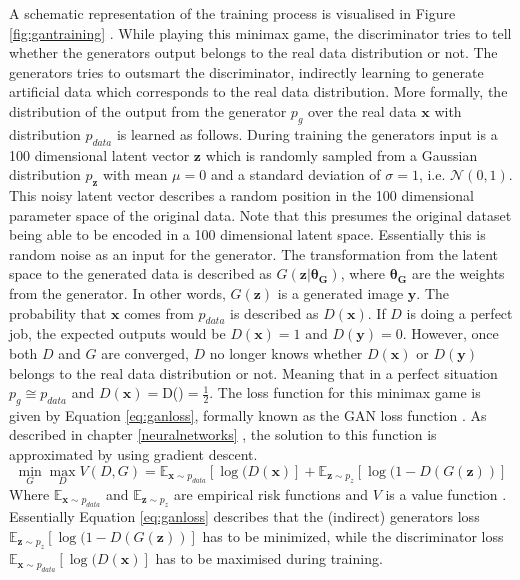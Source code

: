 A schematic representation of the training process is visualised in Figure \ref{fig:gantraining} . While playing this minimax game, the discriminator tries to tell whether the generators output belongs to the real data distribution or not. The generators tries to outsmart the discriminator, indirectly learning to generate artificial data which corresponds to the real data distribution. More formally, the distribution of the output from the generator $p_g$ over the real data $\mathbf{x}$ with distribution $p_{data}$ is learned as follows. During training the generators input is a 100 dimensional latent vector $\boldsymbol{z}$ which is randomly sampled from a Gaussian distribution $p_{\boldsymbol{z}}$ with mean $\mu=0$ and a standard deviation of $\sigma=1$, i.e. $\mathcal{N}(0,1)$. This noisy latent vector describes a random position in the 100 dimensional parameter space of the original data. Note that this presumes the original dataset being able to be encoded in a 100 dimensional latent space. Essentially this is random noise as an input for the generator. The transformation from the latent space to the generated data is described as $G(\boldsymbol{z}|\boldsymbol{\theta_G})$, where $\boldsymbol{\theta_G}$ are the weights from the generator. In other words, $G(\boldsymbol{z})$ is a generated image $\boldsymbol{y}$. The probability that $\boldsymbol{x}$ comes from $p_{data}$ is described as $D(\boldsymbol{x})$. If $D$ is doing a perfect job, the expected outputs would be $D(\boldsymbol{x})=1$ and $D(\boldsymbol{y})=0$. However, once both $D$ and $G$ are converged, $D$ no longer knows whether $D(\boldsymbol{x})$ or $D(\boldsymbol{y})$ belongs to the real data distribution or not. Meaning that in a perfect situation $p_g \cong p_{data}$ and $D(\boldsymbol{x})=$D()$=\frac{1}{2}$. The loss function for this minimax game is given by Equation \ref{eq:ganloss}, formally known as the GAN loss function \cite{goodfellow2014generative}. As described in chapter \ref{neuralnetworks} , the solution to this function is approximated by using gradient descent.
\begin{equation}
    \min_{G} \max_{D} V(D,G) = \mathbb{E}_{\boldsymbol{x} \sim p_{data}} [\log(D(\boldsymbol{x})] + \mathbb{E}_{\boldsymbol{z} \sim p_{z}} [\log(1-D(G(\boldsymbol{z}))]
    \label{eq:ganloss}
\end{equation}
Where $\mathbb{E}_{\boldsymbol{x} \sim p_{data}}$ and $\mathbb{E}_{\boldsymbol{z} \sim p_{z}}$ are empirical risk functions and $V$ is a value function \cite{goodfellow2014generative}. Essentially Equation \ref{eq:ganloss} describes that the (indirect) generators loss $\mathbb{E}_{\boldsymbol{z} \sim p_{z}} [\log(1-D(G(\boldsymbol{z}))]$ has to be minimized, while the discriminator loss $\mathbb{E}_{\boldsymbol{x} \sim p_{data}} [\log(D(\boldsymbol{x})]$ has to be maximised during training.   


